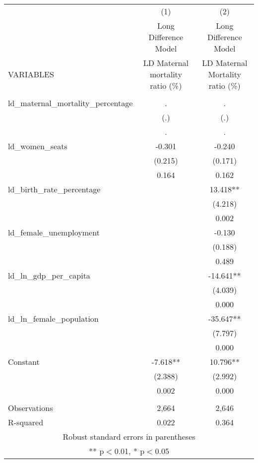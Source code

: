 \begin{tabular}{lcc} \hline
 & (1) & (2) \\
 & Long Difference Model & Long Difference Model \\
VARIABLES & LD Maternal mortality ratio (\%) & LD Maternal Mortality ratio (\%) \\ \hline
 &  &  \\
ld\_maternal\_mortality\_percentage & . & . \\
 & (.) & (.) \\
 & . & . \\
ld\_women\_seats & -0.301 & -0.240 \\
 & (0.215) & (0.171) \\
 & 0.164 & 0.162 \\
ld\_birth\_rate\_percentage &  & 13.418** \\
 &  & (4.218) \\
 &  & 0.002 \\
ld\_female\_unemployment &  & -0.130 \\
 &  & (0.188) \\
 &  & 0.489 \\
ld\_ln\_gdp\_per\_capita &  & -14.641** \\
 &  & (4.039) \\
 &  & 0.000 \\
ld\_ln\_female\_population &  & -35.647** \\
 &  & (7.797) \\
 &  & 0.000 \\
Constant & -7.618** & 10.796** \\
 & (2.388) & (2.992) \\
 & 0.002 & 0.000 \\
 &  &  \\
Observations & 2,664 & 2,646 \\
 R-squared & 0.022 & 0.364 \\ \hline
\multicolumn{3}{c}{ Robust standard errors in parentheses} \\
\multicolumn{3}{c}{ ** p$<$0.01, * p$<$0.05} \\
\end{tabular}
